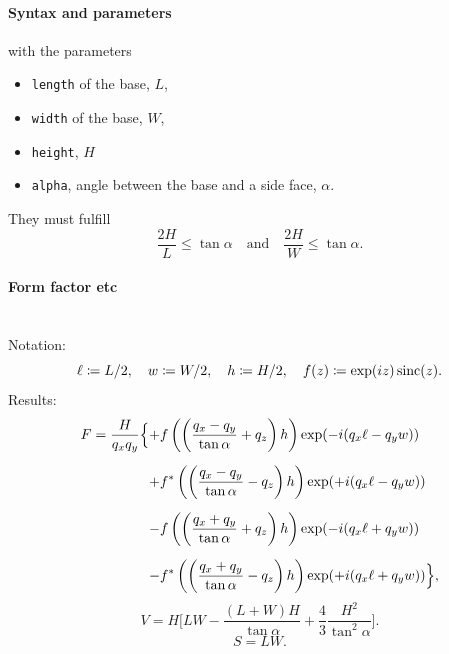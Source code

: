 \FloatBarrier

\paragraph{Syntax and parameters}
\begin{quote}
\end{quote}
with the parameters
\begin{itemize}
\item \texttt{length} of the base, $L$,
\item \texttt{width} of the base, $W$,
\item \texttt{height}, $H$
\item \texttt{alpha}, angle between the base and a side face, $\alpha$.
\end{itemize}
They must fulfill
\begin{displaymath}
\dfrac{2H}{L}\le\tan\alpha\quad\text{and}\quad\dfrac{2H}{W}\le\tan\alpha.
\end{displaymath}

\paragraph{Form factor etc}\strut\\
Notation:
\begin{displaymath}
  \ell\coloneqq L/2,\quad
  w\coloneqq W/2,\quad
  h\coloneqq H/2,\quad
  f(z)\coloneqq \exp(i z)\operatorname{sinc}(z).
\end{displaymath}
Results:
\begin{equation*}
\begin{array}{@{}l@{}l@{}}
\DS F=
\frac{H}{q_xq_y} \Big\{
   &+\DS  f\left(\left(\frac{q_x-q_y}{\tan\alpha} +q_z\right)h\right)
        \exp(-i(q_x\ell-q_y w))
\\[3.6ex]
   &\DS+ f^*\left(\left(\frac{q_x-q_y}{\tan\alpha} -q_z\right)h\right)
        \exp(+i(q_x\ell-q_y w))
\\[3.6ex]
   &\DS- f\left(\left(\frac{q_x+q_y}{\tan\alpha} +q_z\right)h\right)
        \exp(-i(q_x\ell+q_y w))
\\[3.6ex]
   &\DS- f^*\left(\left(\frac{q_x+q_y}{\tan\alpha} -q_z\right)h\right)
        \exp(+i(q_x\ell+q_y w))
\Big\},
\end{array}
\end{equation*}
\begin{equation*}
  V= H \Big[LW - \dfrac{(L + W)H}{\tan\alpha} + \dfrac{4}{3} \dfrac{H^2}{\tan^2\alpha}\Big].
\end{equation*}
\begin{equation*}
  S=LW.
\end{equation*}

